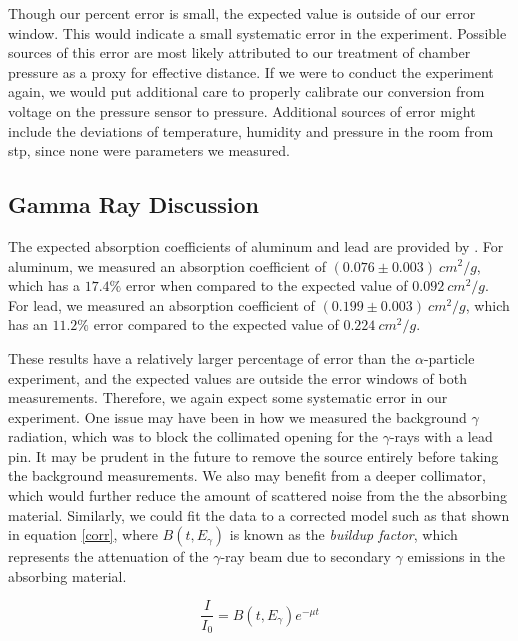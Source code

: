 \documentclass[10pt]{article}
\begin{document}
\begin{multicols}{2}
Though our percent error is small, the expected value is outside of our error window.  This would indicate a small systematic error in the experiment.  Possible sources of this error are most likely attributed to our treatment of chamber pressure as a proxy for effective distance.  If we were to conduct the experiment again, we would put additional care to properly calibrate our conversion from voltage on the pressure sensor to pressure.  Additional sources of error might include the deviations of temperature, humidity and pressure in the room from stp, since none were parameters we measured. 

\subsection{Gamma Ray Discussion}

The expected absorption coefficients of aluminum and lead are provided by \cite{bib:4}.  For aluminum, we measured an absorption coefficient of $(0.076 \pm 0.003) \ cm^{2}/g$, which has a $17.4 \%$ error when compared to the expected value of $0.092 \ cm^{2}/g$.  For lead, we measured an absorption coefficient of $(0.199 \pm 0.003) \ cm^{2}/g$, which has an $11.2 \%$ error compared to the expected value of $0.224 \ cm^{2}/g$. \par

These results have a relatively larger percentage of error than the $\alpha$-particle experiment, and the expected values are outside the error windows of both measurements.  Therefore, we again expect some systematic error in our experiment.  One issue may have been in how we measured the background $\gamma$ radiation, which was to block the collimated opening for the $\gamma$-rays with a lead pin.  It may be prudent in the future to remove the source entirely before taking the background measurements.  We also may benefit from a deeper collimator, which would further reduce the amount of scattered noise from the the absorbing material.  Similarly, we could fit the data to a corrected model such as that shown in equation \ref{corr}, where $B\left(t, E_{\gamma}\right)$ is known as the \textit{buildup factor}, which represents the attenuation of the $\gamma$-ray beam due to secondary $\gamma$ emissions in the absorbing material.

\begin{equation}
	\frac{I}{I_{0} } = B\left(t, E_{\gamma}\right) e^{-\mu t} \label{corr}
\end{equation}


\end{multicols}
\end{document}
